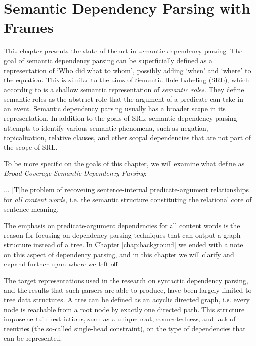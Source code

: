 \chapter{Semantic Dependency Parsing with Frames}
\label{chap:semantic}

This chapter presents the state-of-the-art in semantic dependency parsing. The goal of semantic dependency parsing can be superficially defined as a representation of `Who did what to whom', possibly adding `when' and `where' to the equation. This is similar to the aims of Semantic Role Labeling (SRL), which according to  is a shallow semantic representation of \textit{semantic roles}. They define semantic roles as the abstract role that the argument of a predicate can take in an event. Semantic dependency parsing usually has a broader scope in its representation. In addition to the goals of SRL, semantic dependency parsing attempts to identify various semantic phenomena, such as negation, topicalization, relative clauses, and other scopal dependencies that are not part of the scope of SRL.

To be more specific on the goals of this chapter, we will examine what  define as \textit{Broad Coverage Semantic Dependency Parsing}:

\begin{displayquote}
... [T]he problem of recovering sentence-internal predicate-argument relationships for \textit{all} \textit{content} \textit{words}, i.e. the semantic structure constituting the relational core of sentence meaning.
\end{displayquote}

The emphasis on predicate-argument dependencies for all content words is the reason for focusing on dependency parsing techniques that can output a graph structure instead of a tree. In Chapter \ref{chap:background} we ended with a note on this aspect of dependency parsing, and in this chapter we will clarify and expand further upon where we left off.

The target representations used in the research on syntactic dependency parsing, and the results that such parsers are able to produce, have been largely limited to tree data structures. A tree can be defined as an acyclic directed graph, i.e. every node is reachable from a root node by exactly one directed path. This structure impose certain restrictions, such as a unique root, connectedness, and lack of reentries (the so-called single-head constraint), on the type of dependencies that can be represented.

